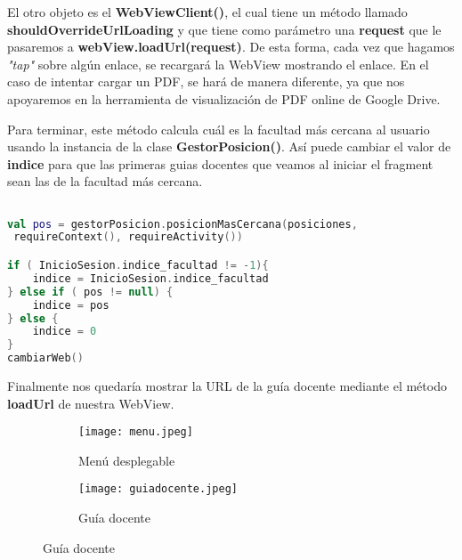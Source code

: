 El otro objeto es el \textbf{WebViewClient()}, el cual tiene un método llamado \textbf{shouldOverrideUrlLoading} y que tiene como parámetro una \textbf{request} que le pasaremos a \textbf{webView.loadUrl(request)}. De esta forma, cada vez que hagamos \textit{"tap"} sobre algún enlace, se recargará la WebView mostrando el enlace. En el caso de intentar cargar un PDF, se hará de manera diferente, ya que nos apoyaremos en la herramienta de visualización de PDF online de Google Drive.

Para terminar, este método calcula cuál es la facultad más cercana al usuario usando la instancia de la clase \textbf{GestorPosicion()}. Así puede cambiar el valor de \textbf{indice} para que las primeras guias docentes que veamos al iniciar el fragment sean las de la facultad más cercana.

\begin{lstlisting}[language=Kotlin]

val pos = gestorPosicion.posicionMasCercana(posiciones,
 requireContext(), requireActivity())

if ( InicioSesion.indice_facultad != -1){
	indice = InicioSesion.indice_facultad
} else if ( pos != null) {
	indice = pos
} else {
	indice = 0
}
cambiarWeb()

\end{lstlisting}

Finalmente nos quedaría mostrar la URL de la guía docente mediante el método \textbf{loadUrl} de nuestra WebView.

\newpage

\begin{figure}[H]
\begin{subfigure}{0.5\textwidth}
  \centering
  \texttt{[image: menu.jpeg]}
  \caption{Menú desplegable}
  \label{fig:sub-first}
\end{subfigure}
\begin{subfigure}{0.5\textwidth}
  \centering
  \texttt{[image: guiadocente.jpeg]}
  \caption{Guía docente}
  \label{fig:sub-second}
\end{subfigure}
\end{figure}

